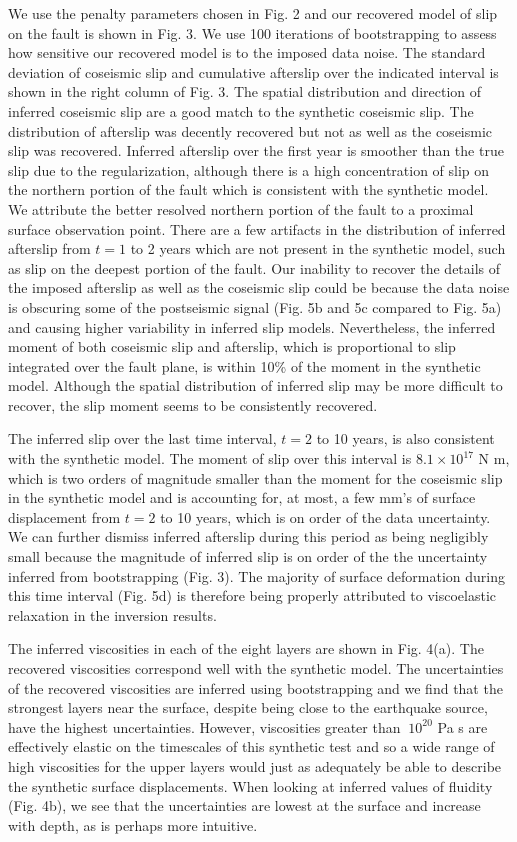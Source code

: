 We use the penalty parameters chosen in Fig. 2 and our recovered model
of slip on the fault is shown in Fig. 3.  We use 100 iterations of
bootstrapping to assess how sensitive our recovered model is to the
imposed data noise.  The standard deviation of coseismic slip and
cumulative afterslip over the indicated interval is shown in the right
column of Fig. 3.  The spatial distribution and direction of inferred
coseismic slip are a good match to the synthetic coseismic slip.  The
distribution of afterslip was decently recovered but not as well as
the coseismic slip was recovered. Inferred afterslip over the first
year is smoother than the true slip due to the regularization,
although there is a high concentration of slip on the northern portion
of the fault which is consistent with the synthetic model.  We
attribute the better resolved northern portion of the fault to a
proximal surface observation point.  There are a few artifacts in the
distribution of inferred afterslip from $t=1$ to 2 years which are not
present in the synthetic model, such as slip on the deepest portion of
the fault. Our inability to recover the details of the imposed
afterslip as well as the coseismic slip could be because the data
noise is obscuring some of the postseismic signal (Fig. 5b and 5c
compared to Fig. 5a) and causing higher variability in inferred slip
models. Nevertheless, the inferred moment of both coseismic slip and
afterslip, which is proportional to slip integrated over the fault
plane, is within 10\% of the moment in the synthetic model.  Although
the spatial distribution of inferred slip may be more difficult to
recover, the slip moment seems to be consistently recovered.

The inferred slip over the last time interval, $t=2$ to 10 years, is
also consistent with the synthetic model.  The moment of slip over
this interval is $8.1\times 10^{17}$ N m, which is two orders of
magnitude smaller than the moment for the coseismic slip in the
synthetic model and is accounting for, at most, a few mm's of surface
displacement from $t=2$ to 10 years, which is on order of the data
uncertainty. We can further dismiss inferred afterslip during this
period as being negligibly small because the magnitude of inferred
slip is on order of the the uncertainty inferred from bootstrapping
(Fig. 3).  The majority of surface deformation during this time
interval (Fig. 5d) is therefore being properly attributed to
viscoelastic relaxation in the inversion results.

The inferred viscosities in each of the eight layers are shown in
Fig. 4(a).  The recovered viscosities correspond well with the
synthetic model.  The uncertainties of the recovered viscosities are
inferred using bootstrapping and we find that the strongest layers
near the surface, despite being close to the earthquake source,
have the highest uncertainties.  However, viscosities greater than
$~10^{20}$ Pa s are effectively elastic on the timescales of this
synthetic test and so a wide range of high viscosities for the upper
layers would just as adequately be able to describe the synthetic
surface displacements.  When looking at inferred values of fluidity
(Fig. 4b), we see that the uncertainties are lowest at the surface and
increase with depth, as is perhaps more intuitive.

